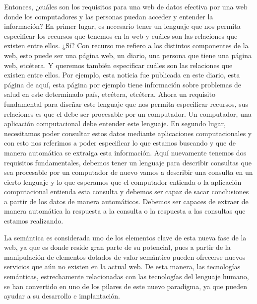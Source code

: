Entonces, ¿cuáles son los requisitos para una web de datos efectiva por una web donde los computadores y las personas puedan acceder y entender la información? En primer lugar, es necesario tener un lenguaje que nos permita especificar los recursos que tenemos en la web y cuáles son las relaciones que existen entre ellos. ¿Sí? Con recurso me refiero a los distintos componentes de la web, esto puede ser una página web, un diario, una persona que tiene una página web, etcétera. Y queremos también especificar cuáles son las relaciones que existen entre ellos. Por ejemplo, esta noticia fue publicada en este diario, esta página de aquí, esta página por ejemplo tiene información sobre problemas de salud en este determinado país, etcétera, etcétera. Ahora un requisito fundamental para diseñar este lenguaje que nos permita especificar recursos, sus relaciones es que el debe ser procesable por un computador. Un computador, una aplicación computacional debe entender este lenguaje. En segundo lugar, necesitamos poder consultar estos datos mediante aplicaciones computacionales y con esto nos referimos a poder especificar lo que estamos buscando y que de manera automática se extraiga esta información. Aquí nuevamente tenemos dos requisitos fundamentales, debemos tener un lenguaje para describir consultas que sea procesable por un computador de nuevo vamos a describir una consulta en un cierto lenguaje y lo que esperamos que el computador entienda o la aplicación computacional entienda esta consulta y debemos ser capaz de sacar conclusiones a partir de los datos de manera automáticos. Debemos ser capaces de extraer de manera automática la respuesta a la consulta o la respuesta a las consultas que estamos realizando.

La semántica es considerada uno de los elementos clave de esta nueva fase de la web, ya que es donde reside gran parte de su potencial, pues a partir de la manipulación de elementos dotados de valor semántico pueden ofrecerse nuevos servicios que aún no existen en la actual web. De esta manera, las tecnologías semánticas, estrechamente relacionadas con las tecnologías del lenguaje humano, se han convertido en uno de los pilares de este nuevo paradigma, ya que pueden ayudar a su desarrollo e implantación.

